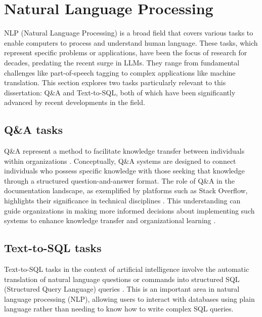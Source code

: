     \section{Natural Language Processing} \label{sec:nlp-review}

        NLP (Natural Language Processing) is a broad field that covers various tasks to enable computers to process and understand human language. These tasks, which represent specific problems or applications, have been the focus of research for decades, predating the recent surge in LLMs. They range from fundamental challenges like part-of-speech tagging to complex applications like machine translation. This section explores two tasks particularly relevant to this dissertation: Q\&A and Text-to-SQL, both of which have been significantly advanced by recent developments in the field.

        \subsection{Q\&A tasks}     

            Q\&A represent a method to facilitate knowledge transfer between individuals within organizations \citep{Iske2005}. 
            Conceptually, Q\&A systems are designed to connect individuals who possess specific knowledge with those seeking that knowledge through a structured question-and-answer format. 
            The role of Q\&A in the documentation landscape, as exemplified by platforms such as Stack Overflow, highlights their significance in technical disciplines \citep{Treude2011}. 
            This understanding can guide organizations in making more informed decisions about implementing such systems to enhance knowledge transfer and organizational learning \citep{Iske2005}.

        \subsection{Text-to-SQL tasks} 

            Text-to-SQL tasks in the context of artificial intelligence involve the automatic translation of natural language questions or commands into structured SQL (Structured Query Language) queries \citep{Qin2022}. This is an important area in natural language processing (NLP), allowing users to interact with databases using plain language rather than needing to know how to write complex SQL queries.         
                
